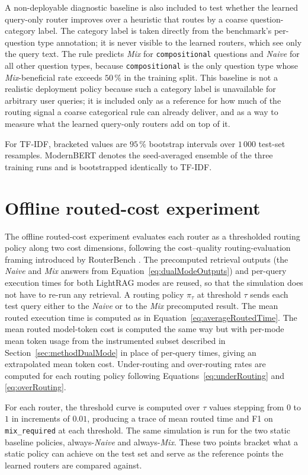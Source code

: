 \documentclass[english, bibtex]{kththesis}               %
\numberwithin{listing}{chapter}
\begin{document}
A non-deployable diagnostic baseline is also included to test whether the learned query-only router improves over a heuristic that routes by a coarse question-category label. The category label is taken directly from the benchmark's per-question type annotation; it is never visible to the learned routers, which see only the query text. The rule predicts \emph{Mix} for \texttt{compositional} questions and \emph{Naive} for all other question types, because \texttt{compositional} is the only question type whose \emph{Mix}-beneficial rate exceeds $50\,\%$ in the training split. This baseline is not a realistic deployment policy because such a category label is unavailable for arbitrary user queries; it is included only as a reference for how much of the routing signal a coarse categorical rule can already deliver, and as a way to measure what the learned query-only routers add on top of it.

For TF-IDF, bracketed values are $95\,\%$ bootstrap intervals \cite{efron1979bootstrap} over $1\,000$ test-set resamples. ModernBERT denotes the seed-averaged ensemble of the three training runs and is bootstrapped identically to TF-IDF.

\section{Offline routed-cost experiment}
\label{sec:implPolicy}

The offline routed-cost experiment evaluates each router as a thresholded routing policy along two cost dimensions, following the cost--quality routing-evaluation framing introduced by RouterBench \cite{hu2024routerbench}. The precomputed retrieval outputs (the \emph{Naive} and \emph{Mix} answers from Equation~\ref{eq:dualModeOutputs}) and per-query execution times for both LightRAG modes are reused, so that the simulation does not have to re-run any retrieval. A routing policy $\pi_{\tau}$ at threshold $\tau$ sends each test query either to the \emph{Naive} or to the \emph{Mix} precomputed result. The mean routed execution time is computed as in Equation~\ref{eq:averageRoutedTime}. The mean routed model-token cost is computed the same way but with per-mode mean token usage from the instrumented subset described in Section~\ref{sec:methodDualMode} in place of per-query times, giving an extrapolated mean token cost. Under-routing and over-routing rates are computed for each routing policy following Equations~\ref{eq:underRouting} and \ref{eq:overRouting}.

For each router, the threshold curve is computed over $\tau$ values stepping from $0$ to $1$ in increments of $0.01$, producing a trace of mean routed time and F1 on \texttt{mix\_required} at each threshold. The same simulation is run for the two static baseline policies, always-\emph{Naive} and always-\emph{Mix}. These two points bracket what a static policy can achieve on the test set and serve as the reference points the learned routers are compared against.
\end{document}
